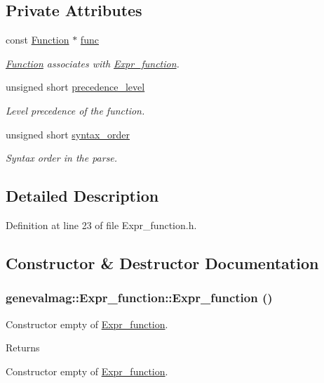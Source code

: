 \subsection*{Private Attributes}
\begin{DoxyCompactItemize}
\item 
const \hyperlink{classgenevalmag_1_1Function}{Function} $\ast$ \hyperlink{classgenevalmag_1_1Expr__function_a8248bebb1840bf2d2fcb2e818ba5a3eb}{func}
\begin{DoxyCompactList}\small\item\em \hyperlink{classgenevalmag_1_1Function}{Function} associates with \hyperlink{classgenevalmag_1_1Expr__function}{Expr\_\-function}. \item\end{DoxyCompactList}\item 
unsigned short \hyperlink{classgenevalmag_1_1Expr__function_a98a74d7ae5aaeb4b0d69c79845f8ce8f}{precedence\_\-level}
\begin{DoxyCompactList}\small\item\em Level precedence of the function. \item\end{DoxyCompactList}\item 
unsigned short \hyperlink{classgenevalmag_1_1Expr__function_adfde16cebcb1963e540a8f92eddb69a1}{syntax\_\-order}
\begin{DoxyCompactList}\small\item\em Syntax order in the parse. \item\end{DoxyCompactList}\end{DoxyCompactItemize}


\subsection{Detailed Description}


Definition at line 23 of file Expr\_\-function.h.



\subsection{Constructor \& Destructor Documentation}
\hypertarget{classgenevalmag_1_1Expr__function_a11842df1439746a952704518f5e1df1e}{
\subsubsection[{Expr\_\-function}]{\setlength{\rightskip}{0pt plus 5cm}genevalmag::Expr\_\-function::Expr\_\-function ()}}
\label{classgenevalmag_1_1Expr__function_a11842df1439746a952704518f5e1df1e}
Constructor empty of \hyperlink{classgenevalmag_1_1Expr__function}{Expr\_\-function}. \begin{DoxyReturn}{Returns}

\end{DoxyReturn}
Constructor empty of \hyperlink{classgenevalmag_1_1Expr__function}{Expr\_\-function}. 

